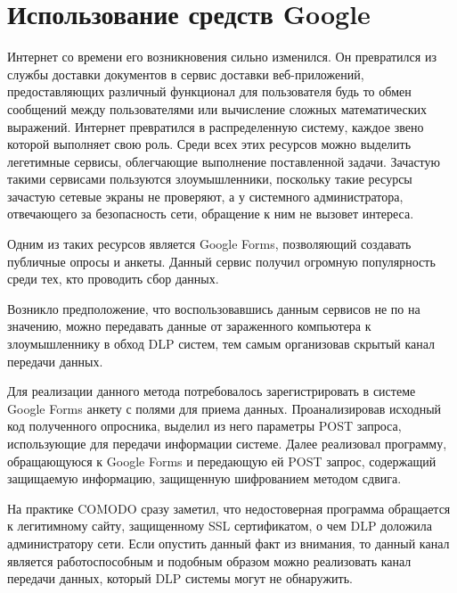 \section{Использование средств Google}

Интернет со времени его возникновения сильно изменился. Он превратился из службы доставки документов в сервис доставки веб-приложений, предоставляющих различный функционал для пользователя будь то обмен сообщений между пользователями или вычисление сложных математических выражений. Интернет превратился в распределенную систему, каждое звено которой выполняет свою роль. Среди всех этих ресурсов можно выделить легетимные сервисы, облегчающие выполнение поставленной задачи. Зачастую такими сервисами пользуются злоумышленники, поскольку такие ресурсы зачастую сетевые экраны не проверяют, а у системного администратора, отвечающего за безопасность сети, обращение к ним не вызовет интереса. 

Одним из таких ресурсов является Google Forms, позволяющий создавать публичные опросы и анкеты. Данный сервис получил огромную популярность среди тех, кто проводить сбор данных. 

Возникло предположение, что воспользовавшись данным сервисов не по на значению, можно передавать данные от зараженного компьютера к злоумышленнику в обход DLP систем, тем самым организовав скрытый канал передачи данных.

Для реализации данного метода потребовалось зарегистрировать в системе Google Forms анкету с полями для приема данных. Проанализировав исходный код полученного опросника, выделил из него параметры POST запроса, использующие для передачи информации системе. Далее реализовал программу, обращающуюся к Google Forms и передающую ей POST запрос, содержащий защищаемую информацию, защищенную шифрованием методом сдвига.

На практике COMODO сразу заметил, что недостоверная программа обращается к легитимному сайту, защищенному SSL сертификатом, о чем DLP доложила администратору сети. Если опустить данный факт из внимания, то данный канал является работоспособным и подобным образом можно реализовать канал передачи данных, который DLP системы могут не обнаружить.

